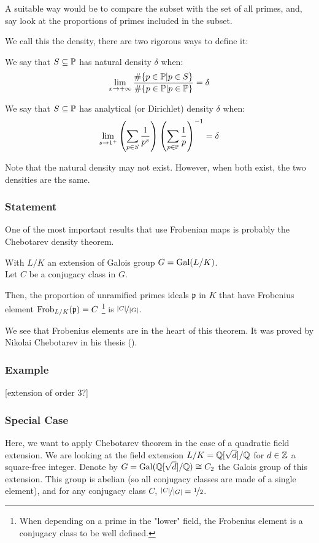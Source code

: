 A suitable way would be to compare the subset with the set of all primes, and, say look at the proportions of primes included in the subset.

We call this the density, there are two rigorous ways to define it:
\begin{definition}
	We say that $S \subseteq \mathbb{P}$ has natural density $\delta$ when:
	$$
	\lim_{x \to +\infty}
	\frac{ \# \{ p \in \mathbb{P} | p \in S \}}
	{ \# \{ p \in \mathbb{P} | p \in \mathbb{P} \}} = \delta
	$$
\end{definition}
\begin{definition}
	We say that $S \subseteq \mathbb{P}$ has analytical (or Dirichlet) density $\delta$ when:
	$$
	\lim_{s \to 1^+}
	\left( \sum_{p \in S} \frac{1}{p^s} \right) 
	\left( \sum_{p \in \mathbb{P}} \frac{1}{p} \right)^{-1} = \delta
	$$
\end{definition}

Note that the natural density may not exist.
However, when both exist, the two densities are the same.



\subsubsection{Statement}
One of the most important results that use Frobenian maps is probably the Chebotarev density theorem.
\begin{theorem}
	With $L/K$ an extension of Galois group $G=\text{Gal}(L/K)$.\\
	Let $C$ be a conjugacy class in $G$.
	
	Then, the proportion of unramified primes ideals $\mathfrak{p}$ in $K$ that have Frobenius element $\text{Frob}_{L/K}(\mathfrak{p})=C$ \footnote{When depending on a prime in the "lower" field, the Frobenius element is a conjugacy class to be well defined.} is $\nicefrac{|C|}{|G|}$.
\end{theorem}
We see that Frobenius elements are in the heart of this theorem.
It was proved by Nikolai Chebotarev in his thesis (\cite{ChebotarevTheorem}).

\subsubsection{Example}
[extension of order 3?]

\subsubsection{Special Case}
Here, we want to apply Chebotarev theorem in the case of a quadratic field extension.
We are looking at the field extension $L/K = \mathbb{Q}[\sqrt{d}]/\mathbb{Q}$ for $d \in \mathbb{Z}$ a square-free integer.
Denote by $G = \text{Gal}(\mathbb{Q}[\sqrt{d}]/\mathbb{Q}) \cong C_2$ the Galois group of this extension.
This group is abelian (so all conjugacy classes are made of a single element), and for any conjugacy class $C$, $\nicefrac{|C|}{|G|} = \nicefrac{1}{2}$.

